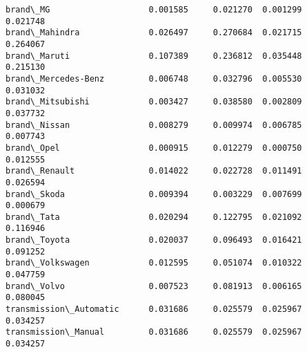 \documentclass[11pt]{article}
\begin{document}
\begin{tcolorbox}[breakable, size=fbox, boxrule=.5pt, pad at break*=1mm, opacityfill=0]
\begin{Verbatim}[commandchars=\\\{\}]
brand\_MG                    0.001585     0.021270  0.001299     0.021748
brand\_Mahindra              0.026497     0.270684  0.021715     0.264067
brand\_Maruti                0.107389     0.236812  0.035448     0.215130
brand\_Mercedes-Benz         0.006748     0.032796  0.005530     0.031032
brand\_Mitsubishi            0.003427     0.038580  0.002809     0.037732
brand\_Nissan                0.008279     0.009974  0.006785     0.007743
brand\_Opel                  0.000915     0.012279  0.000750     0.012555
brand\_Renault               0.014022     0.022728  0.011491     0.026594
brand\_Skoda                 0.009394     0.003229  0.007699     0.000679
brand\_Tata                  0.020294     0.122795  0.021092     0.116946
brand\_Toyota                0.020037     0.096493  0.016421     0.091252
brand\_Volkswagen            0.012595     0.051074  0.010322     0.047759
brand\_Volvo                 0.007523     0.081913  0.006165     0.080045
transmission\_Automatic      0.031686     0.025579  0.025967     0.034257
transmission\_Manual         0.031686     0.025579  0.025967     0.034257


\end{Verbatim}
\end{tcolorbox}
\end{document}
